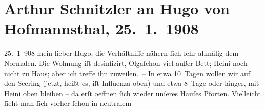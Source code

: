 

         
         \renewcommand{\erwaehntePersonen}{Personen: Richard Beer-Hofmann, Hugo von Hofmannsthal, Olga Schnitzler, Heinrich Schnitzler, Karl Werkmann}
         \renewcommand{\erwaehnteInstitutionen}{Institutionen: Franz-Grillparzer-Preis}
         \renewcommand{\erwaehnteOrte}{Orte: Semmering, Wien}
         \renewcommand{\erwaehnteWerke}{}
               \section[Arthur Schnitzler an Hugo von Hofmannsthal, 25. 1. 1908]{ Arthur Schnitzler an Hugo von Hofmannsthal, 25. 1. 1908}\nopagebreak{}\rehead{ }\begin{ledgroupsized}[t]{13cm}\normalsize\beginnumbering \toendnotes[C]{\smallbreak\pagebreak[2]} 
\toendnotes[C]{\smallbreak}\pstart
           \raggedleft{}{\pb}25. 1 908\pend
           \pstart{}mein lieber Hugo,\pend\pstart
           die Verhältniſſe nähern ſich ſehr allmälig dem \label{K_L01758-1v}\label{K_L01758-1h} Normalen.
               Die Wohnung iſt desinfizirt, Olgaſchon viel außer Bett; Heini noch nicht zu Haus; aber ich treffe ihn zuweilen. –\pend
           \pstart
           In etwa 10 Tagen wollen wir auf den Se{\geminationm}ering (jetzt, heißt es, iſt Influenza oben) und
               etwa 8 Tage oder länger, mit Heini oben
               bleiben – da{\geminationn} erſt oeffnen ſich wieder unſeres Hauſes
               Pforten.\pend
           \pstart
           {\pb}Vielleicht ſieht man ſich vorher ſchon in neutralem

\end{ledgroupsized}
